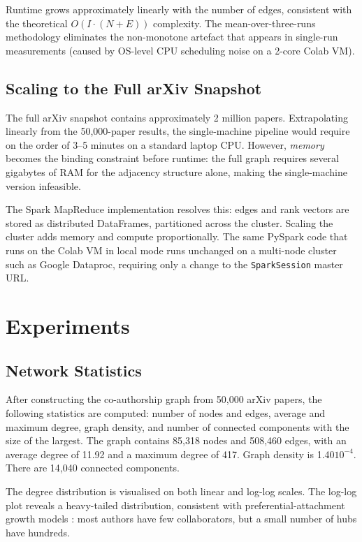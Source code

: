 \documentclass[12pt, a4paper]{article}
\begin{document}
Runtime grows approximately linearly with the number of edges, consistent with the theoretical $O(I \cdot (N+E))$ complexity. The mean-over-three-runs methodology eliminates the non-monotone artefact that appears in single-run measurements (caused by OS-level CPU scheduling noise on a 2-core Colab VM).

\subsection{Scaling to the Full arXiv Snapshot}

The full arXiv snapshot contains approximately 2 million papers. Extrapolating linearly from the 50{,}000-paper results, the single-machine pipeline would require on the order of 3--5 minutes on a standard laptop CPU. However, \textit{memory} becomes the binding constraint before runtime: the full graph requires several gigabytes of RAM for the adjacency structure alone, making the single-machine version infeasible.

The Spark MapReduce implementation resolves this: edges and rank vectors are stored as distributed DataFrames, partitioned across the cluster. Scaling the cluster adds memory and compute proportionally. The same PySpark code that runs on the Colab VM in local mode runs unchanged on a multi-node cluster such as Google Dataproc, requiring only a change to the \texttt{SparkSession} master URL.

\section{Experiments}

\subsection{Network Statistics}

After constructing the co-authorship graph from 50{,}000 arXiv papers, the following statistics are computed: number of nodes and edges, average and maximum degree, graph density, and number of connected components with the size of the largest. The graph contains 85,318 nodes and 508,460 edges, with an average degree of 11.92 and a maximum degree of 417. Graph density is 1.40\times $10^{-4}$. There are 14,040 connected components.

The degree distribution is visualised on both linear and log-log scales. The log-log plot reveals a heavy-tailed distribution, consistent with preferential-attachment growth models \cite{barabasi1999}: most authors have few collaborators, but a small number of hubs have hundreds.
\end{document}
